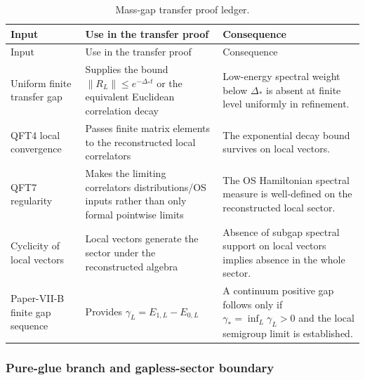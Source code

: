 \documentclass[12pt,a4paper]{article}
\begin{document}
\begin{longtable}{>{\raggedright\arraybackslash}p{} >{\raggedright\arraybackslash}p{} >{\raggedright\arraybackslash}p{}}
\caption[Mass-gap transfer proof ledger]{Mass-gap transfer proof ledger.}\label{p12:tab:mass-gap-transfer-proof-ledger}\\
\toprule
Input & Use in the transfer proof & Consequence \\
\midrule
\endfirsthead
\toprule
Input & Use in the transfer proof & Consequence \\
\midrule
\endhead
Uniform finite transfer gap & Supplies the bound \(\|R_L\|\le e^{-\Delta_\ast t}\) or the equivalent Euclidean correlation decay & Low-energy spectral weight below \(\Delta_\ast\) is absent at finite level uniformly in refinement. \\
QFT4 local convergence & Passes finite matrix elements to the reconstructed local correlators & The exponential decay bound survives on local vectors. \\
QFT7 regularity & Makes the limiting correlators distributions/OS inputs rather than only formal pointwise limits & The OS Hamiltonian spectral measure is well-defined on the reconstructed local sector. \\
Cyclicity of local vectors & Local vectors generate the sector under the reconstructed algebra & Absence of subgap spectral support on local vectors implies absence in the whole sector. \\
Paper-VII-B finite gap sequence & Provides \(\gamma_L=E_{1,L}-E_{0,L}\) & A continuum positive gap follows only if \(\gamma_*=\inf_L\gamma_L>0\) and the local semigroup limit is established. \\
\bottomrule
\end{longtable}


\subsubsection{Pure-glue branch and gapless-sector boundary}
\label{p12:sec:pure-glue-gapless-boundary}
\end{document}
